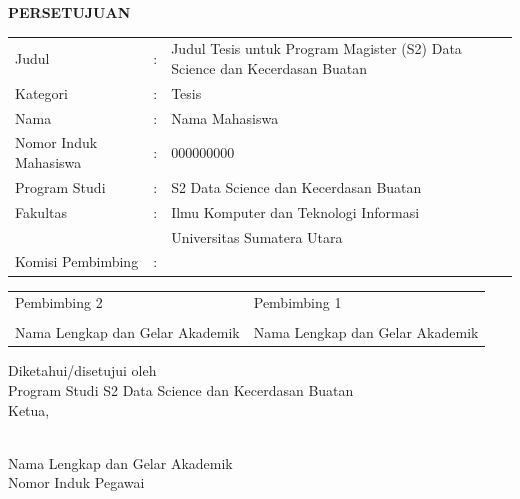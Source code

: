 \thispagestyle{empty}
\begin{center}
{\bfseries PERSETUJUAN\par}
\vspace{18mm} %
\end{center}

\noindent
\begin{tabular}{@{}p{4.6cm}@{}l@{\;}p{8.8cm}@{}}
Judul          & : & Judul Tesis untuk Program Magister (S2) Data Science dan Kecerdasan Buatan \\[4pt]
Kategori       & : & Tesis \\[4pt]
Nama           & : & Nama Mahasiswa \\[4pt]
Nomor Induk Mahasiswa & : & 000000000 \\[4pt]
Program Studi  & : & S2 Data Science dan Kecerdasan Buatan \\[4pt]
Fakultas       & : & Ilmu Komputer dan Teknologi Informasi\\
               &   & Universitas Sumatera Utara \\[4pt]
Komisi Pembimbing & : & \\
\end{tabular}

\vspace{12mm}

\noindent
\begin{tabular}{@{}p{7.6cm}p{7.6cm}@{}}
Pembimbing 2 & Pembimbing 1 \\[14mm]
\hrulefill & \hrulefill \\
Nama Lengkap dan Gelar Akademik & Nama Lengkap dan Gelar Akademik \\
\end{tabular}

\vspace{10mm}

\noindent Diketahui/disetujui oleh\\
Program Studi S2 Data Science dan Kecerdasan Buatan\\
Ketua,

\vspace{12mm}

\noindent\hrulefill\\
Nama Lengkap dan Gelar Akademik\\
Nomor Induk Pegawai
\clearpage

